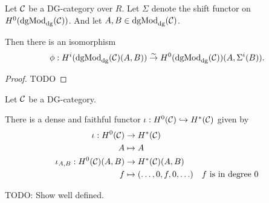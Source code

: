 
\begin{proposition}
    \label{prop:H^i_dgmod_cong_H^0_with_shift}
    Let \( {\mathcal{C}} \) be a DG-category over \( R \). Let \( \Sigma \) denote the shift functor on \( H^0(\operatorname{dgMod}_{\operatorname{dg}}({\mathcal{C}})) \). And let \( A, B \in \operatorname{dgMod}_{\operatorname{dg}}({\mathcal{C}}) \).

    Then there is an isomorphism
    \[
        \phi: H^i(\operatorname{dgMod}_{\operatorname{dg}}({\mathcal{C}})(A, B)) \stackrel{\sim}{\to} H^0(\operatorname{dgMod}_{\operatorname{dg}}({\mathcal{C}}))(A, \Sigma^i(B)).
    \]
\end{proposition}
\begin{proof}
    TODO
\end{proof}

\begin{remark}
    \label{rem:H^0_into_H^*_inclusion}
    Let \( {\mathcal{C}} \) be a DG-category.

    There is a dense and faithful functor \( \iota: H^0({\mathcal{C}}) \hookrightarrow H^*({\mathcal{C}}) \) given by
    \begin{align*}
        \iota: H^0(\Cc) &\to H^*(\Cc) \\
        A &\mapsto A \\
        \iota_{A, B}: H^0(\Cc)(A, B) &\to H^*(\Cc)(A, B) \\
        f &\mapsto \tuple{\dots, 0, f, 0, \dots} \quad \text{\( f \) is in degree \( 0 \)}
    \end{align*}

    TODO: Show well defined.
\end{remark}

